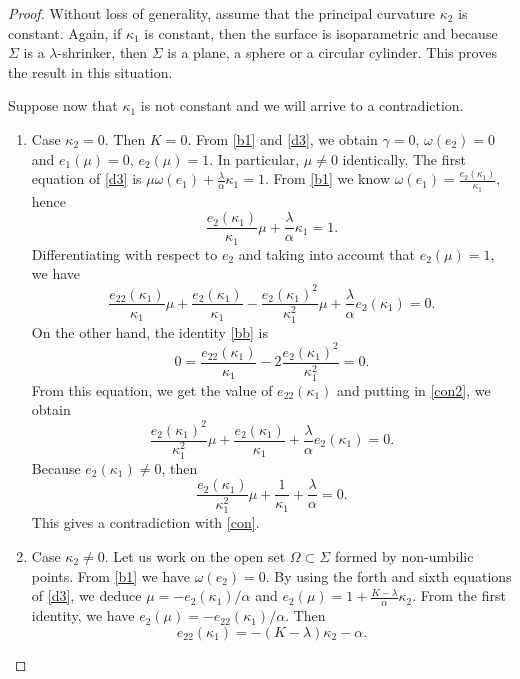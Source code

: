 \documentclass[a4paper,12pt]{amsart}
\theoremstyle{definition}
\begin{document}
\begin{proof} Without loss of generality, assume that  the principal curvature $\kappa_2$ is constant. Again, if   $\kappa_1$ is constant, then the surface is isoparametric and because $\Sigma$ is a $\lambda$-shrinker, then  $\Sigma$ is a plane, a sphere or a circular cylinder. This proves the result  in this situation.

Suppose now that $\kappa_1$ is not constant and we will arrive to a contradiction.

\begin{enumerate}
\item Case $\kappa_2=0$. Then $K=0$. From \eqref{b1} and   \eqref{d3}, we obtain $\gamma=0$, $\omega(e_2)=0$ and $e_1(\mu)=0$, $e_2(\mu)=1$.      In particular,  $\mu\not=0$ identically. The first equation of \eqref{d3} is 
$\mu\omega(e_1) +\frac{\lambda}{\alpha}\kappa_1=1$. From \eqref{b1} we know $\omega(e_1)=\frac{e_2(\kappa_1)}{\kappa_1}$, hence
\begin{equation}\label{con}
\frac{e_2(\kappa_1)}{\kappa_1}\mu+\frac{\lambda}{\alpha}\kappa_1=1.
\end{equation}
Differentiating with respect to $e_2$ and taking into account that $e_2(\mu)=1$, we have  
\begin{equation}\label{con2}
\frac{e_{22}(\kappa_1)}{\kappa_1}\mu+\frac{e_2(\kappa_1)}{\kappa_1}-\frac{e_2(\kappa_1)^2}{\kappa_1^2}\mu+\frac{\lambda}{\alpha}e_2(\kappa_1)=0.
\end{equation}
On the other hand, the identity \eqref{bb} is 
$$0=\frac{e_{22}(\kappa_1)}{\kappa_1}-2\frac{e_2(\kappa_1)^2}{\kappa_1^2}=0.$$ 
From this equation, we get the value of $e_{22}(\kappa_1)$ and putting in \eqref{con2}, we obtain 
$$\frac{e_2(\kappa_1)^2}{\kappa_1^2}\mu+\frac{e_2(\kappa_1)}{\kappa_1}+\frac{\lambda}{\alpha}e_2(\kappa_1)=0.$$
Because $e_2(\kappa_1)\not=0$, then
$$\frac{e_2(\kappa_1)}{\kappa_1^2}\mu+\frac{1}{\kappa_1}+\frac{\lambda}{\alpha}=0.$$
This gives a contradiction with \eqref{con}.
\item Case $\kappa_2\not=0$.    Let us work on the  open set $\Omega\subset \Sigma$ formed by non-umbilic points. From \eqref{b1} we have $\omega(e_2)=0$. By using the forth and sixth equations of \eqref{d3}, we deduce   $\mu=- e_2(\kappa_1)/\alpha$ and $e_2(\mu)=1+\frac{K-\lambda}{\alpha}\kappa_2$. From the first identity, we have  
$e_2(\mu)=-  e_{22}(\kappa_1)/\alpha$. Then 
\begin{equation}\label{d22}
e_{22}(\kappa_1)=-(K-\lambda)\kappa_2-\alpha.
\end{equation}

\end{enumerate}
\end{proof}
\end{document}
